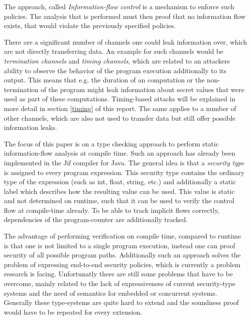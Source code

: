 \documentclass[a4paper,UKenglish]{lipics-v2018}
\begin{document}
The approach, called \textit{Information-flow control} is a mechanism to enforce such policies. The analysis that is performed must then proof that no information flow exists, that would violate the previously specified policies.\cite{language_based_information_flow_security}

There are a significant number of channels one could leak information over, which are not directly transferring data. An example for such channels would be \textit{termination channels} and \textit{timing channels}, which are related to an attackers ability to observe the behavior of the program execution additionally to its output. This means that e.g. the duration of an computation or the non-termination of the program might leak information about secret values that were used as part of these computations. Timing-based attacks will be explained in more detail in section \ref{timing} of this report.
The same applies to a number of other channels, which are also not used to transfer data but still offer possible information leaks.\cite{language_based_information_flow_security}

The focus of this paper is on a type checking approach to perform static information-flow analysis at compile time. Such an approach has already been implemented in the Jif compiler for Java.\cite{JFlow} The general idea is that a \textit{security type} is assigned to every program expression. This security type contains the ordinary type of the expression (such as int, float, string, etc.) and additionally a static label which describes how the resulting value can be used. This value is static and not determined on runtime, such that it can be used to verify the control flow at compile-time already.\cite{language_based_information_flow_security}
To be able to track implicit flows correctly, dependencies of the program-counter are additionally tracked.

The advantage of performing verification on compile time, compared to runtime is that one is not limited to a single program execution, instead one can proof security of all possible program paths.\cite{language_based_information_flow_security} Additionally such an approach solves the problem of expressing end-to-end security policies, which is currently a problem research is facing. Unfortunatly there are still some problems that have to be overcome, mainly related to the lack of expressiveness of current security-type systems and the need of semantics for embedded or concurrent systems. Generally these type-systems are quite hard to extend and the soundness proof would have to be repeated for every extension.\cite{language_based_information_flow_security}
\end{document}
